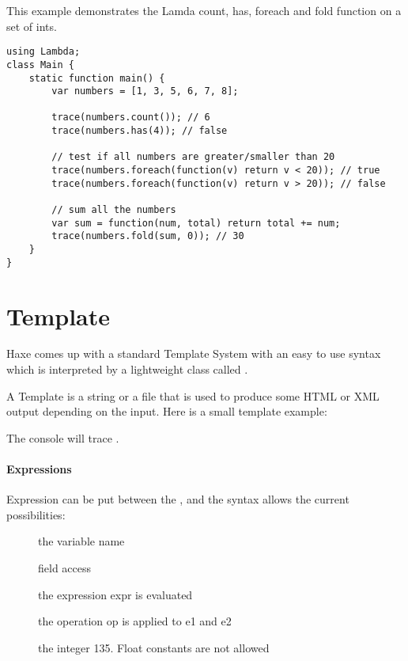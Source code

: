 This example demonstrates the Lamda count, has, foreach and fold function on a set of ints.

\begin{lstlisting}
using Lambda;
class Main {
    static function main() {
        var numbers = [1, 3, 5, 6, 7, 8];
		
		trace(numbers.count()); // 6
		trace(numbers.has(4)); // false
		
        // test if all numbers are greater/smaller than 20
		trace(numbers.foreach(function(v) return v < 20)); // true
        trace(numbers.foreach(function(v) return v > 20)); // false
		
        // sum all the numbers
		var sum = function(num, total) return total += num;
		trace(numbers.fold(sum, 0)); // 30
    }
}
\end{lstlisting} 

\section{Template}
\label{std-template}

Haxe comes up with a standard Template System with an easy to use syntax which is interpreted by a lightweight class called .

A Template is a string or a file that is used to produce some HTML or XML output depending on the input. Here is a small template example:


The console will trace .

\paragraph{Expressions}
Expression can be put between the \ic{::}, and the syntax allows the current possibilities:

\begin{description}
	\item[] the variable name
	\item[] field access
	\item[] the expression expr is evaluated
	\item[] the operation op is applied to e1 and e2
	\item[] the integer 135. Float constants are not allowed
\end{description}

